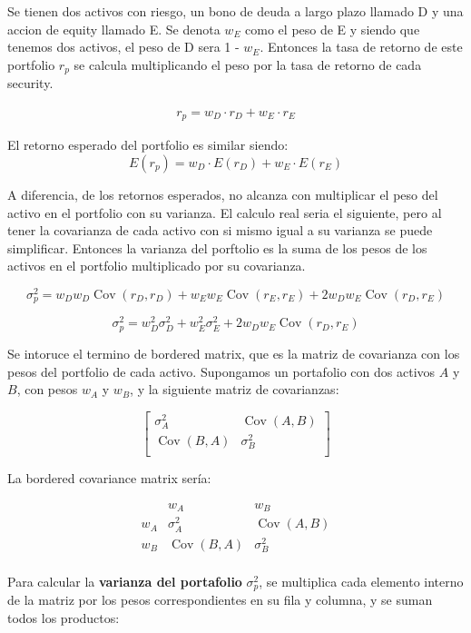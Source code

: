\documentclass{article}
\begin{document}
Se tienen dos activos con riesgo, un bono de deuda a largo plazo llamado D y una accion de equity llamado E. Se denota $w_E$ como el peso de E y siendo que tenemos dos activos,
el peso de D sera 1 - $w_E$. Entonces la tasa de retorno de este portfolio $r_p$ se calcula multiplicando el peso por la tasa
de retorno de cada security.

\[
\begin{aligned}
r_p = w_D \cdot r_D + w_E \cdot r_E
\end{aligned}
\]

El retorno esperado del portfolio es similar siendo:
\[
E(r_p) = w_D \cdot E(r_D) + w_E \cdot E(r_E)
\] 

A diferencia, de los retornos esperados, no alcanza con multiplicar el peso del activo en el portfolio
 con su varianza. El calculo real seria el siguiente, pero al tener la covarianza de cada activo con si mismo igual a su varianza
  se puede simplificar. Entonces la varianza del porftolio es la suma de los pesos de los activos en el portfolio multiplicado por su covarianza.

 \[
 \sigma_p^2 = w_D w_D \operatorname{Cov}(r_D, r_D) + w_E w_E \operatorname{Cov}(r_E, r_E) + 2 w_D w_E \operatorname{Cov}(r_D, r_E)
\]

\[
\sigma_p^2 = w_D^2 \sigma_D^2 + w_E^2 \sigma_E^2 + 2 w_D w_E \operatorname{Cov}(r_D, r_E)
\]


Se intoruce el termino de bordered matrix, que es la matriz de covarianza con los pesos del portfolio de cada activo.
Supongamos un portafolio con dos activos \( A \) y \( B \), con pesos \( w_A \) y \( w_B \), y la siguiente matriz de covarianzas:

\[
\begin{bmatrix}
\sigma_A^2 & \operatorname{Cov}(A, B) \\
\operatorname{Cov}(B, A) & \sigma_B^2 \\
\end{bmatrix}
\]

La bordered covariance matrix sería:

\[
\begin{array}{c|cc}
 & w_A & w_B \\
\hline
w_A & \sigma_A^2 & \operatorname{Cov}(A, B) \\
w_B & \operatorname{Cov}(B, A) & \sigma_B^2 \\
\end{array}
\]

\bigskip

Para calcular la \textbf{varianza del portafolio} \( \sigma_p^2 \), se multiplica cada elemento interno de la matriz 
por los pesos correspondientes en su fila y columna, y se suman todos los productos:
\end{document}
